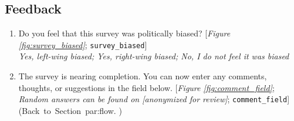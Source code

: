  \subsection*{Feedback} 
 \begin{enumerate}[resume] 
\item  \label{q:survey_biased} Do you feel that this survey was politically biased? [\textit{Figure \ref{fig:survey_biased}}; 
\verb|survey_biased|]
  \\ \textit{Yes, left-wing biased; Yes, right-wing biased; No, I do not feel it was biased}

\item  \label{q:comment_field} The survey is nearing completion. You can now enter any comments, thoughts, or suggestions in the field below. [\textit{Figure \ref{fig:comment_field}}; \textit{Random answers can be found on [anonymized for review]}; 
\verb|comment_field|] \hfill (Back~to~Section~{par:flow}.%
 )



 \end{enumerate} 

